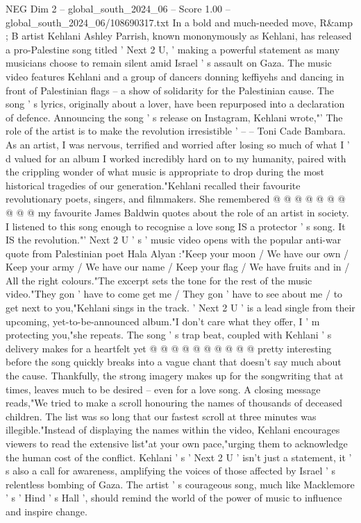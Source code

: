 \begin{textsample}{NEG Dim 2 – global\_south\_2024\_06 – Score 1.00 – global\_south\_2024\_06/108690317.txt}  \label{ex:f2_neg_325}
In a bold and much-needed move, R\&amp ; B artist Kehlani Ashley Parrish, known mononymously as Kehlani, has released a pro-Palestine song titled ' Next 2 U, ' making a powerful statement as many musicians choose to remain silent amid Israel ' s assault on Gaza.
The music video features Kehlani and a group of dancers donning keffiyehs and dancing in front of Palestinian flags -- a show of solidarity for the Palestinian cause.
The song ' s lyrics, originally about a lover, have been repurposed into a declaration of defence.
Announcing the song ' s release on Instagram, Kehlani wrote,"' The role of the artist is to make the revolution irresistible ' -- -- Toni Cade Bambara.
As an artist, I was nervous, terrified and worried after losing so much of what I ' d valued for an album I worked incredibly hard on to my humanity, paired with the crippling wonder of what music is appropriate to drop during the most historical tragedies of our generation."Kehlani recalled their favourite revolutionary poets, singers, and filmmakers.
She remembered @ @ @ @ @ @ @ @ @ @ my favourite James Baldwin quotes about the role of an artist in society.
I listened to this song enough to recognise a love song IS a protector ' s song.
It IS the revolution."' Next 2 U ' s ' music video opens with the popular anti-war quote from Palestinian poet Hala Alyan :"Keep your moon / We have our own / Keep your army / We have our name / Keep your flag / We have fruits and in / All the right colours."The excerpt sets the tone for the rest of the music video."They gon ' have to come get me / They gon ' have to see about me / to get next to you,"Kehlani sings in the track. ' Next 2 U ' is a lead single from their upcoming, yet-to-be-announced album."I don't care what they offer, I ' m protecting you,"she repeats.
The song ' s trap beat, coupled with Kehlani ' s delivery makes for a heartfelt yet @ @ @ @ @ @ @ @ @ @ pretty interesting before the song quickly breaks into a vague chant that doesn't say much about the cause.
Thankfully, the strong imagery makes up for the songwriting that at times, leaves much to be desired -- even for a love song.
A closing message reads,"We tried to make a scroll honouring the names of thousands of deceased children.
The list was so long that our fastest scroll at three minutes was illegible."Instead of displaying the names within the video, Kehlani encourages viewers to read the extensive list"at your own pace,"urging them to acknowledge the human cost of the conflict.
Kehlani ' s ' Next 2 U ' isn't just a statement, it ' s also a call for awareness, amplifying the voices of those affected by Israel ' s relentless bombing of Gaza.
The artist ' s courageous song, much like Macklemore ' s ' Hind ' s Hall ', should remind the world of the power of music to influence and inspire change.

\end{textsample}
